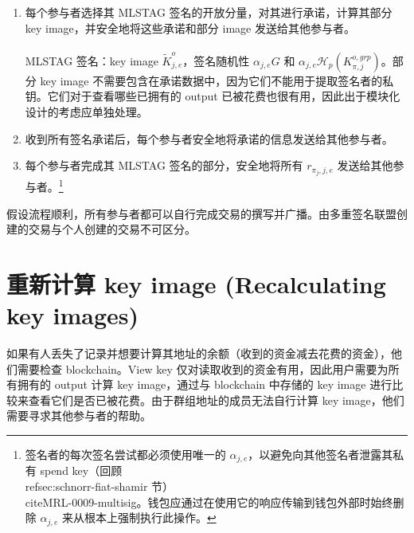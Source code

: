 \begin{enumerate}
\begin{enumerate}
        发起者将所有信息安全地发送给其他参与者。\footnote{他不需要直接发送 output 金额 $b_t$，因为它们可以从 $\mathit{amount}_t$ 计算出来。Monero 采用了合理的方法：创建一个由发起者选择的信息填充的部分交易，并将其与其他相关信息（如交易私钥、目标地址、真实 input 等）一起发送给其他共同签名者。}其他参与者可以通过发送下一轮通信的部分来表示同意，或协商修改。
        \item 每个参与者选择其 MLSTAG 签名的开放分量，对其进行承诺，计算其部分 key image，并安全地将这些承诺和部分 image 发送给其他参与者。\\\\

        MLSTAG 签名：key image $\tilde{K}^{o}_{j,e}$，签名随机性 $\alpha_{j,e} G$ 和 $\alpha_{j,e} \mathcal{H}_p(K^{o,grp}_{\pi,j})$。部分 key image 不需要包含在承诺数据中，因为它们不能用于提取签名者的私钥。它们对于查看哪些已拥有的 output 已被花费也很有用，因此出于模块化设计的考虑应单独处理。
        \item 收到所有签名承诺后，每个参与者安全地将承诺的信息发送给其他参与者。
        \item 每个参与者完成其 MLSTAG 签名的部分，安全地将所有 $r_{{\pi_j},j,e}$ 发送给其他参与者。\footnote{签名者的每次签名尝试都必须使用唯一的 $\alpha_{j,e}$，以避免向其他签名者泄露其私有 spend key（回顾 \\ref{sec:schnorr-fiat-shamir} 节）\\cite{MRL-0009-multisig}。钱包应通过在使用它的响应传输到钱包外部时始终删除 $\alpha_{j,e}$ 来从根本上强制执行此操作。}
    \end{enumerate}
\end{enumerate}

假设流程顺利，所有参与者都可以自行完成交易的撰写并广播。由多重签名联盟创建的交易与个人创建的交易不可区分。


\section{重新计算 key image (Recalculating key images)}
\label{sec:recalculating-key-images-multisig}

如果有人丢失了记录并想要计算其地址的余额（收到的资金减去花费的资金），他们需要检查 blockchain。View key 仅对读取收到的资金有用，因此用户需要为所有拥有的 output 计算 key image，通过与 blockchain 中存储的 key image 进行比较来查看它们是否已被花费。由于群组地址的成员无法自行计算 key image，他们需要寻求其他参与者的帮助。

